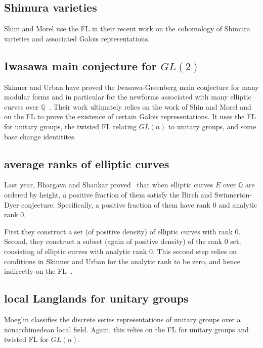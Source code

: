 \documentclass[brochure,english,12pt]{bourbaki}
\newcommand{\ring}[1]{\mathbb{#1}}
\begin{document}
\subsection{Shimura varieties}

Shim and Morel use the FL in their recent work on the cohomology of Shimura varieties and associated
Galois representations.

\subsection{Iwasawa main conjecture for $GL(2)$}

Skinner and Urban have proved the Iwasawa-Greenberg main conjecture for
many modular forms and in particular for the newforms associated with
many elliptic curves over $\ring{Q}$~\cite{SU}.  Their work ultimately
relies on the work of Shin and Morel and on the FL to prove the
existence of certain Galois representations.  It uses the FL for unitary
groups, the twisted FL relating $GL(n)$ to unitary groups, and some
base change identitites.

\subsection{average ranks of elliptic curves}

Last year, Bhargava and Shankar proved~\cite{BS} that
when elliptic curves $E$ over $\ring{Q}$ are ordered
  by height, a positive fraction of them satisfy the Birch and
  Swinnerton-Dyer conjecture.  Specifically, a positive fraction of them
  have rank $0$ and analytic rank $0$.


First they construct a set (of positive
density) of elliptic curves with rank $0$.  Second, they construct a
subset (again of positive density) of the rank $0$ set, consisting of
elliptic curves with analytic rank $0$.  This second step relies on
conditions in Skinner and Urban for the analytic rank to be zero, and hence
indirectly on the FL~\cite[Theorem~2]{SU}.

\subsection{local Langlands for unitary groups}

Moeglin classifies the discrete series representations of unitary
groups over a nonarchimedean local field.  Again, this relies on the
FL for unitary groups and twisted FL for $GL(n)$.

\end{document}
